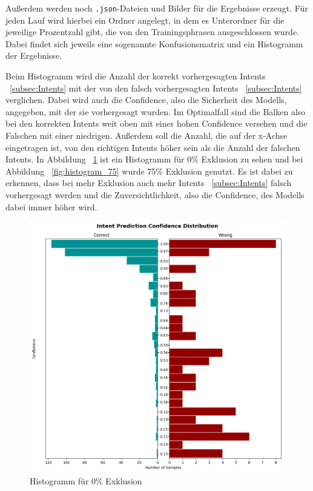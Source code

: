 Außerdem werden noch \texttt{.json}-Dateien und Bilder für die Ergebnisse erzeugt.
Für jeden Lauf wird hierbei ein Ordner angelegt, in dem es Unterordner für die jeweilige Prozentzahl gibt, die von den Trainingsphrasen ausgeschlossen wurde.
Dabei findet sich jeweils eine sogenannte Konfusionsmatrix und ein Histogramm der Ergebnisse.

Beim Histogramm wird die Anzahl der korrekt vorhergesagten Intents ~\ref{subsec:Intents} mit der von den falsch vorhergesagten Intents ~\ref{subsec:Intents} verglichen.
Dabei wird auch die Confidence, also die Sicherheit des Modells, angegeben, mit der sie vorhergesagt wurden.
Im Optimalfall sind die Balken also bei den korrekten Intents weit oben mit einer hohen Confidence versehen und die Falschen mit einer niedrigen.
Außerdem soll die Anzahl, die auf der x-Achse eingetragen ist, von den richtigen Intents höher sein als die Anzahl der falschen Intents.
In Abbildung ~\ref{fig:histogram_0} ist ein Histogramm für 0\% Exklusion zu sehen und bei Abbildung ~\ref{fig:histogram_75} wurde 75\% Exklusion genutzt.
Es ist dabei zu erkennen, dass bei mehr Exklusion auch mehr Intents ~\ref{subsec:Intents} falsch vorhergesagt werden und die Zuversichtlichkeit, also die Confidence, des Modells dabei immer höher wird.

\begin{figure}[hbt!]
    \centering
    \includegraphics[scale=0.5]{pics/intent_histogram_0}
    \caption{Histogramm für 0\% Exklusion}
    \label{fig:histogram_0}
\end{figure}


